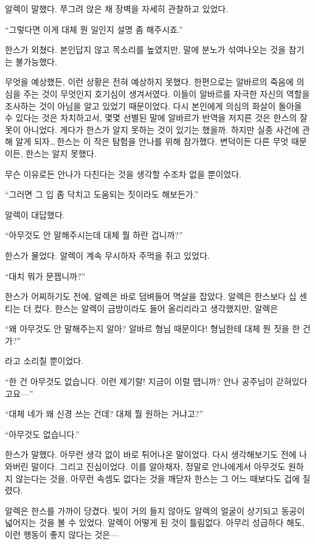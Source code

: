 알렉이 말했다. 쭈그려 앉은 채 장벽을 자세히 관찰하고 있었다.

``그렇다면 이게 대체 뭔 일인지 설명 좀 해주시죠.''

한스가 외쳤다. 본인답지 않고 목소리를 높였지만, 말에 분노가 섞여나오는 것을 참기는 불가능했다.

무엇을 예상했든, 이런 상황은 전혀 예상하지 못했다. 한편으로는 알바르의 죽음에 의심을 주는 것이 무엇인지 호기심이 생겨서였다. 이들이 알바르를 자극한 자신의 역할을 조사하는 것이 아님을 알고 있었기 때문이었다. 다시 본인에게 의심의 화살이 돌아올 수 있다는 것은 차치하고서, 몇몇 선별된 말에 알바르가 반역을 저지른 것은 한스의 잘못이 아니었다. 게다가 한스가 알지 못하는 것이 있기는 했을까. 하지만 실종 사건에 관해 알게 되자\ldots\,한스는 이 작은 탐험을 안나를 위해 참가했다. 변덕이든 다른 무엇 때문이든, 한스는 알지 못했다.

무슨 이유로든 안나가 다친다는 것을 생각할 수조차 없을 뿐이었다.

``그러면 그 입 좀 닥치고 도움되는 짓이라도 해보든가.''

알렉이 대답했다.

``아무것도 안 말해주시는데 대체 뭘 하란 겁니까?''

한스가 물었다. 알렉이 계속 무시하자 주먹을 쥐고 있었다.

``대치 뭐가 문젭니까?''

한스가 어찌하기도 전에, 알렉은 바로 덤벼들어 멱살을 잡았다. 알렉은 한스보다 십 센티는 더 컸다. 한스는 알렉이 금방이라도 들어 올리리라고 생각했지만, 알렉은

``왜 아무것도 안 말해주는지 알아? 알바르 형님 때문이다! 형님한테 대체 뭔 짓을 한 건가?''

라고 소리칠 뿐이었다.

``한 건 아무것도 없습니다. 이런 제기랄! 지금이 이럴 땝니까? 안나 공주님이 갇혀있다고요—''

``대체 네가 왜 신경 쓰는 건데? 대체 뭘 원하는 거냐고?''

``아무것도 없습니다.''

한스가 말했다. 아무런 생각 없이 바로 튀어나온 말이었다. 다시 생각해보기도 전에 나와버린 말이다. 그리고 진심이었다. 이를 알아채자, 정말로 안나에게서 아무것도 원하지 않는다는 것을, 아무런 속셈도 없다는 것을 깨닫자 한스는 그 어느 때보다도 겁에 질렸다.

알렉은 한스를 가까이 당겼다. 빛이 거의 들지 않아도 알렉의 얼굴이 상기되고 동공이 넓어지는 것을 볼 수 있었다. 알렉이 어떻게 된 것이 틀림없다. 아무리 성급하다 해도, 이런 행동이 좋지 않다는 것은—

